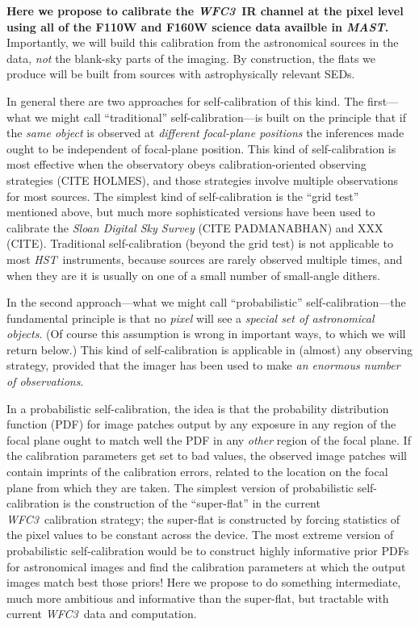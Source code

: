 \documentclass[12pt]{article}
\newcommand{\project}[1]{\textsl{#1}}
\newcommand{\HST}{\project{HST}}
\newcommand{\WFC}{\project{WFC3}}
\newcommand{\MAST}{\project{MAST}}
\begin{document}
\textbf{Here we propose to calibrate the \WFC\ IR channel at the pixel
  level using all of the F110W and F160W science data availble in \MAST.}
Importantly, we will build this calibration from the astronomical
sources in the data, \emph{not} the blank-sky parts of the imaging.
By construction, the flats we produce will be built from sources with
astrophysically relevant SEDs.

In general there are two approaches for self-calibration of this kind.
The first---what we might call ``traditional'' self-calibration---is
built on the principle that if the \emph{same object} is observed at
\emph{different focal-plane positions} the inferences made ought to be
independent of focal-plane position.  This kind of self-calibration is
most effective when the observatory obeys calibration-oriented
observing strategies (CITE HOLMES), and those strategies involve
multiple observations for most sources.  The simplest kind of
self-calibration is the ``grid test'' mentioned above, but much more
sophisticated versions have been used to calibrate the \project{Sloan
  Digital Sky Survey} (CITE PADMANABHAN) and XXX (CITE).  Traditional
self-calibration (beyond the grid test) is not applicable to most
\HST\ instruments, because sources are rarely observed multiple times,
and when they are it is usually on one of a small number of
small-angle dithers.

In the second approach---what we might call ``probabilistic''
self-calibration---the fundamental principle is that no \emph{pixel}
will see a \emph{special set of astronomical objects}.  (Of course
this assumption is wrong in important ways, to which we will return
below.)  This kind of self-calibration is applicable in (almost) any
observing strategy, provided that the imager has been used to make
\emph{an enormous number of observations}.

In a probabilistic self-calibration, the idea is that the probability
distribution function (PDF) for image patches output by any exposure
in any region of the focal plane ought to match well the PDF in any
\emph{other} region of the focal plane.  If the calibration parameters
get set to bad values, the observed image patches will contain
imprints of the calibration errors, related to the location on the
focal plane from which they are taken.  The simplest version of
probabilistic self-calibration is the construction of the
``super-flat'' in the current \WFC\ calibration strategy; the
super-flat is constructed by forcing statistics of the pixel values to
be constant across the device.  The most extreme version of
probabilistic self-calibration would be to construct highly
informative prior PDFs for astronomical images and find the
calibration parameters at which the output images match best those
priors!  Here we propose to do something intermediate, much more
ambitious and informative than the super-flat, but tractable with
current \WFC\ data and computation.
\end{document}

